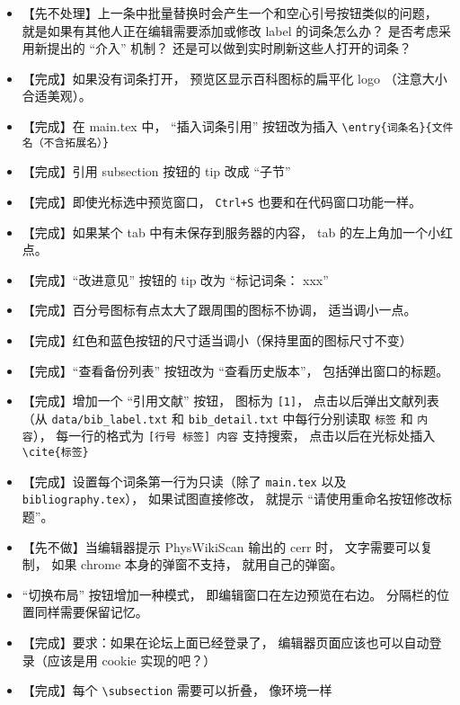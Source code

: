 \begin{itemize}
\item 【先不处理】上一条中批量替换时会产生一个和空心引号按钮类似的问题， 就是如果有其他人正在编辑需要添加或修改 label 的词条怎么办？ 是否考虑采用新提出的 “介入” 机制？ 还是可以做到实时刷新这些人打开的词条？

\item 【完成】如果没有词条打开， 预览区显示百科图标的扁平化 logo （注意大小合适美观）。

\item 【完成】在 main.tex 中， “插入词条引用” 按钮改为插入 \verb|\entry{词条名}{文件名（不含拓展名）}|

\item 【完成】引用 subsection 按钮的 tip 改成 “子节”

\item 【完成】即使光标选中预览窗口， \verb|Ctrl+S| 也要和在代码窗口功能一样。

\item 【完成】如果某个 tab 中有未保存到服务器的内容， tab 的左上角加一个小红点。

\item 【完成】“改进意见” 按钮的 tip 改为 “标记词条： xxx”

\item 【完成】百分号图标有点太大了跟周围的图标不协调， 适当调小一点。

\item 【完成】红色和蓝色按钮的尺寸适当调小（保持里面的图标尺寸不变）

\item 【完成】“查看备份列表” 按钮改为 “查看历史版本”， 包括弹出窗口的标题。

\item 【完成】增加一个 “引用文献” 按钮， 图标为 \verb|[1]|， 点击以后弹出文献列表（从 \verb|data/bib_label.txt| 和 \verb|bib_detail.txt| 中每行分别读取 \verb|标签| 和 \verb|内容|）， 每一行的格式为 \verb|[行号 标签] 内容| 支持搜索， 点击以后在光标处插入 \verb|\cite{标签}|

\item 【完成】设置每个词条第一行为只读（除了 \verb|main.tex| 以及 \verb|bibliography.tex|）， 如果试图直接修改， 就提示 “请使用重命名按钮修改标题”。

\item 【先不做】当编辑器提示 PhysWikiScan 输出的 cerr 时， 文字需要可以复制， 如果 chrome 本身的弹窗不支持， 就用自己的弹窗。

\item “切换布局” 按钮增加一种模式， 即编辑窗口在左边预览在右边。 分隔栏的位置同样需要保留记忆。

\item 【完成】要求：如果在论坛上面已经登录了， 编辑器页面应该也可以自动登录（应该是用 cookie 实现的吧？）

\item 【完成】每个 \verb|\subsection| 需要可以折叠， 像环境一样
\end{itemize}

